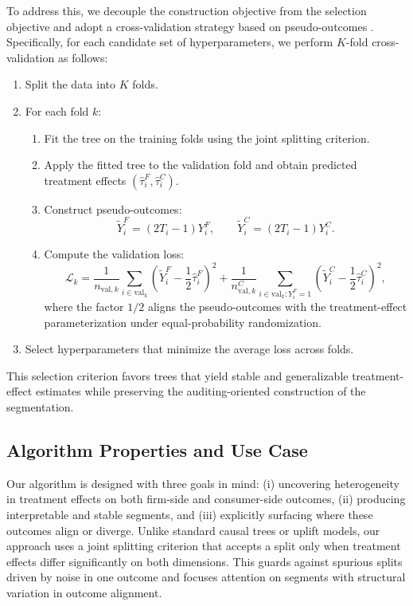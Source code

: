 \documentclass[11pt,letterpaper,english]{article}
\theoremstyle{definition}
\theoremstyle{definition}
\begin{document}
\begin{bibunit}
To address this, we decouple the construction objective from the selection objective and adopt a cross-validation strategy based on pseudo-outcomes \citep{wager2018estimation}. Specifically, for each candidate set of hyperparameters, we perform $K$-fold cross-validation as follows:
\begin{enumerate}
    \item Split the data into $K$ folds.
    \item For each fold $k$:
    \begin{enumerate}
        \item Fit the tree on the training folds using the joint splitting criterion.
        \item Apply the fitted tree to the validation fold and obtain predicted treatment effects $(\hat{\tau}^F_i, \hat{\tau}^C_i)$.
        \item Construct pseudo-outcomes:
        \[
        \tilde{Y}^F_i = (2T_i - 1) Y^F_i, \qquad
        \tilde{Y}^C_i = (2T_i - 1) Y^C_i.
        \]
        \item Compute the validation loss:
        \[
        \mathcal{L}_k =
        \frac{1}{n_{\text{val},k}} \sum_{i \in \text{val}_k}
        \left( \tilde{Y}^F_i - \frac{1}{2}\hat{\tau}^F_i \right)^2
        +
        \frac{1}{n_{\text{val},k}^C} \sum_{i \in \text{val}_k : Y^F_i=1}
        \left( \tilde{Y}^C_i - \frac{1}{2}\hat{\tau}^C_i \right)^2,
        \]
        where the factor $1/2$ aligns the pseudo-outcomes with the treatment-effect parameterization under equal-probability randomization.
    \end{enumerate}
    \item Select hyperparameters that minimize the average loss across folds.
\end{enumerate}

This selection criterion favors trees that yield stable and generalizable treatment-effect estimates while preserving the auditing-oriented construction of the segmentation.

\subsection{Algorithm Properties and Use Case}

Our algorithm is designed with three goals in mind: (i) uncovering heterogeneity in treatment effects on both firm-side and consumer-side outcomes, (ii) producing interpretable and stable segments, and (iii) explicitly surfacing where these outcomes align or diverge. Unlike standard causal trees or uplift models, our approach uses a joint splitting criterion that accepts a split only when treatment effects differ significantly on both dimensions. This guards against spurious splits driven by noise in one outcome and focuses attention on segments with structural variation in outcome alignment.


\end{bibunit}
\end{document}
